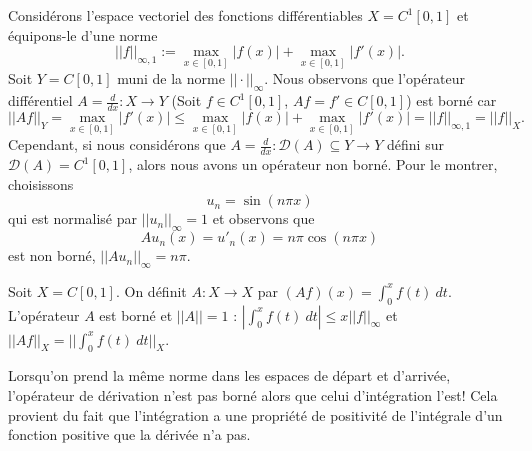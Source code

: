 \begin{example}
    Considérons l'espace vectoriel des fonctions différentiables $X=C^1[0,1]$ et équipons-le d'une norme
    \begin{equation*}
        ||f||_{\infty,1} := \max_{x\in[0,1]}|f(x)| + \max_{x\in[0,1]}|f'(x)|.
    \end{equation*}
    Soit $Y=C[0,1]$ muni de la norme $||\cdot||_\infty$. Nous observons que l'opérateur différentiel $A = \frac{d}{dx} : X\rightarrow Y$ (Soit $f \in C^1[0,1]$, $Af = f'\in C[0,1]$) est borné car
    \begin{equation*}
        ||Af||_Y = \max_{x\in[0,1]} |f'(x)| \leq \max_{x\in[0,1]} |f(x)| + \max_{x\in[0,1]} |f'(x)| = ||f||_{\infty,1} = ||f||_X.
    \end{equation*}
    Cependant, si nous considérons que $A=\frac{d}{dx}:\mathcal{D}(A)\subseteq Y\rightarrow Y$ défini sur $\mathcal{D}(A) = C^1[0,1]$, alors nous avons un opérateur non borné. Pour le montrer, choisissons
    \begin{equation*}
        u_n = \sin(n\pi x)
    \end{equation*}
    qui est normalisé par $||u_n||_\infty = 1$ et observons que
    \begin{equation*}
        Au_n(x) = u'_n(x) = n\pi\cos(n\pi x)
    \end{equation*}
    est non borné, $||Au_n||_\infty = n\pi$.
\end{example}

\begin{example}
    Soit $X=C[0,1]$. On définit $A:X \rightarrow X$ par $(Af)(x)=\int_0^xf(t)\ dt$. L'opérateur $A$ est borné et $||A||=1$ : $|\int_0^x f(t)\ dt| \leq x||f||_\infty$ et $||Af||_X = ||\int_0^x f(t)\ dt||_X$.
\end{example}

\begin{remark}
    Lorsqu'on prend la même norme dans les espaces de départ et d'arrivée, l'opérateur de dérivation n'est pas borné alors que celui d'intégration l'est! Cela provient du fait que l'intégration a une propriété de positivité de l'intégrale d'un fonction positive que la dérivée n'a pas.
\end{remark}

